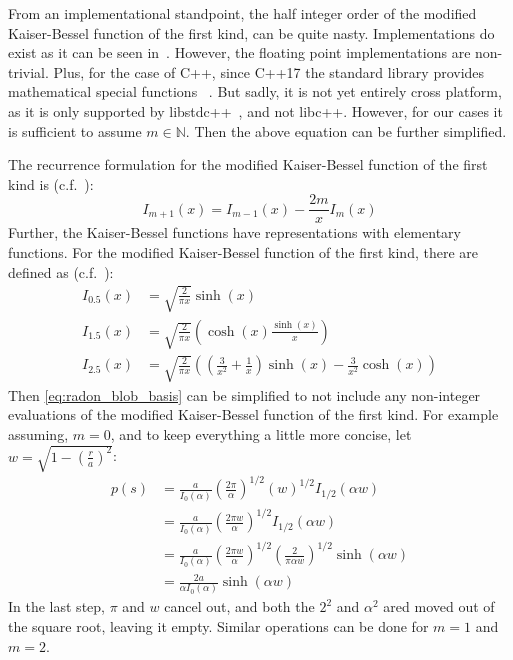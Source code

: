 From an implementational standpoint, the half integer order of the modified Kaiser-Bessel function
of the first kind, can be quite nasty. Implementations do exist as it can be seen
in~\cite{temme_numerical_1975}. However, the floating point implementations are non-trivial. Plus,
for the case of C++, since C++17 the standard library provides mathematical special functions
~\cite{noauthor_c_nodate-3, noauthor_stdcyl_bessel_i_nodate}. But sadly, it is not yet entirely
cross platform, as it is only supported by libstdc++~\cite{noauthor_libstdc_nodate-1}, and not
libc++. However, for our cases it is sufficient to assume \(m \in \mathbb{N}\). Then the above
equation can be further simplified.

The recurrence formulation for the modified Kaiser-Bessel function of the first kind is
(c.f.~\cite[chapter 9]{abramowitz_handbook_1972}):
\begin{equation}\label{eq:kaiser_bessel_recurrence}
	I_{m+1}(x) = I_{m-1}(x) - \frac{2 m}{x}I_m(x)
\end{equation}
Further, the Kaiser-Bessel functions have representations with elementary functions. For the
modified Kaiser-Bessel function of the first kind, there are defined as (c.f.~\cite[chapter 10]{abramowitz_handbook_1972}):
\begin{align}\label{eq:kaiser_bessel_half_integer}
	I_{0.5}(x) & = \sqrt{\frac{2}{\pi x}} \sinh(x)                                                                               \\
	I_{1.5}(x) & = \sqrt{\frac{2}{\pi x}} \left( \cosh(x) \frac{\sinh(x)}{x} \right)                                             \\
	I_{2.5}(x) & = \sqrt{\frac{2}{\pi x}} \left(\left(\frac{3}{x^2} + \frac{1}{x}\right)\sinh(x) - \frac{3}{x^2} \cosh(x)\right)
\end{align}
Then \autoref{eq:radon_blob_basis} can be simplified to not include any non-integer evaluations of
the modified Kaiser-Bessel function of the first kind. For example assuming, \(m = 0\), and to keep
everything a little more concise, let \(w = \sqrt{1 - \left(\frac{r}{a}\right)^2}\):
\begin{align}\label{eq:radon_blob_basis_order_0_simplified}
	p(s) & = \frac{a}{I_0(\alpha)} \left(\frac{2\pi}{\alpha}\right)^{1/2} \left( w \right)^{1/2} I_{1/2}\left( \alpha w \right)                     \\
	     & = \frac{a}{I_0(\alpha)} \left(\frac{2\pi w}{\alpha}\right)^{1/2} I_{1/2}\left( \alpha w \right)                                          \\
	     & = \frac{a}{I_0(\alpha)} \left(\frac{2\pi w}{\alpha}\right)^{1/2} \left( \frac{2}{\pi \alpha w}\right)^{1/2} \sinh \left(\alpha w \right) \\
	     & = \frac{2 a}{\alpha I_0(\alpha)} \sinh \left(\alpha w \right)
\end{align}
In the last step, \(\pi\) and \(w\) cancel out, and both the \(2^2\) and \(\alpha^2\) ared moved out
of the square root, leaving it empty. Similar operations can be done for \(m = 1\) and \(m = 2\).

